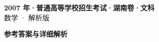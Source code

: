 \documentclass[zihao=-4, a4paper]{ctexart}
\begin{document}
\begin{center}
  {\Large\bfseries 2007 年·普通高等学校招生考试·湖南卷·文科}\\[4pt]
  {\large 数学 · 解析版}
\end{center}
\medskip
{}

\clearpage
{}
\begin{center}{\Large\bfseries 参考答案与详细解析}\end{center}
\medskip

\end{document}
